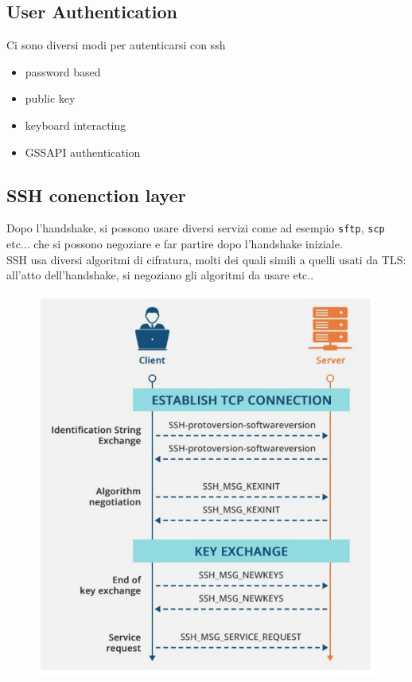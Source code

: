 \documentclass[12pt, oneside]{extbook} %
\begin{document}
\subsection{User Authentication}
Ci sono diversi modi per autenticarsi con ssh
\begin{itemize}
    \item password based
    \item public key
    \item keyboard interacting
    \item GSSAPI authentication
\end{itemize}

\subsection{SSH conenction layer}
Dopo l'handshake, si possono usare diversi servizi come ad esempio \texttt{sftp}, \texttt{scp} etc... che si possono negoziare e far partire dopo l'handshake iniziale.
\\SSH usa diversi algoritmi di cifratura, molti dei quali simili a quelli usati da TLS: all'atto dell'handshake, si negoziano gli algoritmi da usare etc..\\
\begin{figure}[h!]
    \centering
    \includegraphics[scale=0.5]{../../immagini/ssh_hs}
\end{figure}\\\\
\end{document}
